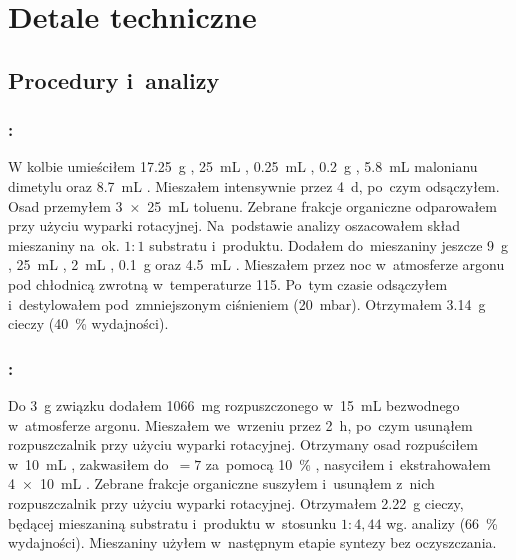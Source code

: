 \chapter{Detale techniczne}\label{chapter:experimental}

\section{Procedury i~analizy}\label{experimental:procedures}
\subsection{%
  :
}\label{syn:cyclopropyl-dimethyl-malonate}
\marginnote{}
W kolbie umieściłem \SI{17.25}{\gram} , \SI{25}{\mL} ,
  \SI{0.25}{\mL} , \SI{0.2}{\gram} , \SI{5.8}{\mL}
  malonianu dimetylu oraz \SI{8.7}{\mL} .
Mieszałem intensywnie przez \SI{4}{\day}, po~czym odsączyłem.
Osad przemyłem \SI[product-units = single]{3 x 25}{\mL} toluenu.
Zebrane frakcje organiczne odparowałem przy użyciu wyparki rotacyjnej.
Na~podstawie analizy \NMR*{} oszacowałem skład mieszaniny na~ok. $1:1$ substratu i~produktu.
Dodałem do~mieszaniny jeszcze \SI{9}{\gram} , \SI{25}{\mL} ,
  \SI{2}{\mL} , \SI{0.1}{\gram}  oraz \SI{4.5}{\mL}
  .
Mieszałem przez noc w~atmosferze argonu pod chłodnicą zwrotną w~temperaturze \SI{115}{\degC}.
Po~tym czasie odsączyłem i~destylowałem pod~zmniejszonym ciśnieniem (\SI{20}{\milli\bar}).
Otrzymałem \SI{3.14}{\gram} cieczy (\SI{40}{\percent} wydajności).

\subsection{%
  :
}\label{syn:cyclopropyl-monomethyl-malonate}
\marginnote{}
Do \SI{3}{\gram} związku  dodałem \SI{1066}{\milli\gram}
   rozpuszczonego w~\SI{15}{\mL} bezwodnego  w~atmosferze argonu.
Mieszałem we~wrzeniu przez \SI{2}{\hour}, po~czym usunąłem rozpuszczalnik
  przy użyciu wyparki rotacyjnej.
Otrzymany osad rozpuściłem w~\SI{10}{\mL} , zakwasiłem do~\pH$=7$ za~pomocą
  \SI{10}{\percent} , nasyciłem  i~ekstrahowałem
  \SI[product-units = single]{4 x 10}{\mL} .
Zebrane frakcje organiczne suszyłem  i~usunąłem z~nich rozpuszczalnik
  przy użyciu wyparki rotacyjnej.
Otrzymałem \SI{2.22}{\gram} cieczy, będącej mieszaniną substratu i~produktu w~stosunku
  $1:4,44$ wg. analizy {\NMR*} (\SI{66}{\percent} wydajności).
Mieszaniny użyłem w~następnym etapie syntezy bez oczyszczania.

